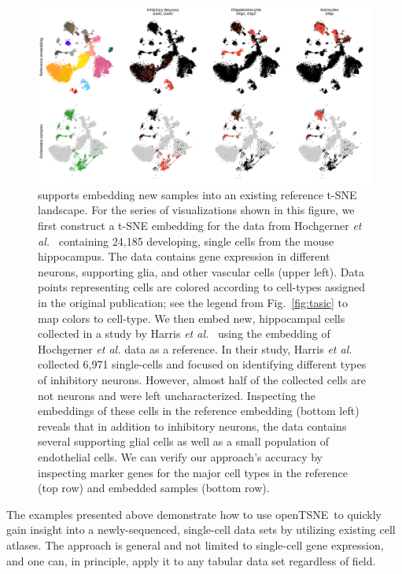 \documentclass[twocolumn]{bmcart}
\newcommand{\opentsne}{\textsf{openTSNE}}
\begin{document}
\begin{figure}[htbp]
  \includegraphics[width=\textwidth]{transform_hochgerner}
  \caption{\label{fig:transform}
\openTSNE supports embedding new samples into an existing reference t-SNE landscape. For the series of visualizations shown in this figure, we first construct a t-SNE embedding for the data from Hochgerner \textit{et al.}~\cite{hochgerner2018conserved} containing 24,185 developing, single cells from the mouse hippocampus. The data contains gene expression in different neurons, supporting glia, and other vascular cells (upper left). Data points representing cells are colored according to cell-types assigned in the original publication; see the legend from Fig.~\ref{fig:tasic} to map colors to cell-type. We then embed new, hippocampal cells collected in a study by Harris \textit{et al.}~\cite{harris2018classes} using the embedding of Hochgerner \textit{et al.} data as a reference. In their study, Harris \textit{et al.} collected 6,971 single-cells and focused on identifying different types of inhibitory neurons. However, almost half of the collected cells are not neurons and were left uncharacterized. Inspecting the embeddings of these cells in the reference embedding (bottom left) reveals that in addition to inhibitory neurons, the data contains several supporting glial cells as well as a small population of endothelial cells. We can verify our approach's accuracy by inspecting marker genes for the major cell types in the reference (top row) and embedded samples (bottom row).
}
\end{figure}

The examples presented above demonstrate how to use \opentsne\ to quickly gain insight into a newly-sequenced, single-cell data sets by utilizing existing cell atlases. The approach is general and not limited to single-cell gene expression, and one can, in principle, apply it to any tabular data set regardless of field.
\end{document}
